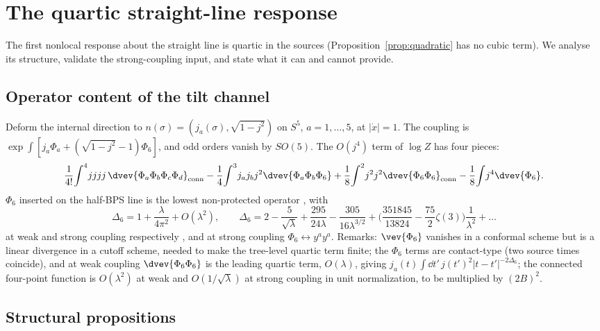 \section{The quartic straight-line response}
\label{sec:quartic}

The first nonlocal response about the straight line is quartic in the sources (Proposition~\ref{prop:quadratic}
has no cubic term). We analyse its structure, validate the strong-coupling input, and state what it can and
cannot provide.

\subsection{Operator content of the tilt channel}

Deform the internal direction to $n(\sigma)=(j_a(\sigma),\sqrt{1-j^2})$ on $S^5$, $a=1,\dots,5$, at $|\dot x|=1$. The
coupling is $\exp\int[j_a\Phi_a+(\sqrt{1-j^2}-1)\Phi_6]$, and odd orders vanish by $SO(5)$. The $O(j^4)$ term of
$\log Z$ has four pieces:
\begin{equation}
\frac1{4!}\!\int^4\!jjjj\,\dvev{\Phi_a\Phi_b\Phi_c\Phi_d}_{\rm conn}
-\frac14\!\int^3\!j_aj_bj^2\dvev{\Phi_a\Phi_b\Phi_6}
+\frac18\!\int^2\!j^2j^2\dvev{\Phi_6\Phi_6}_{\rm conn}
-\frac18\!\int\!j^4\dvev{\Phi_6}.
\end{equation}
$\Phi_6$ inserted on the half-BPS line is the lowest non-protected operator \cite{PolchinskiSully,BGT}, with
\begin{equation}
\Delta_6=1+\frac{\lambda}{4\pi^2}+O(\lambda^2),\qquad
\Delta_6=2-\frac5{\sqrt\lambda}+\frac{295}{24\lambda}-\frac{305}{16\lambda^{3/2}}+\Big(\frac{351845}{13824}-\frac{75}2\zeta(3)\Big)\frac1{\lambda^2}+\dots
\end{equation}
at weak and strong coupling respectively \cite{BGT,GRT,FerreroMeneghelli,GGJ}, and at strong coupling
$\Phi_6\leftrightarrow y^ay^a$. Remarks: $\vev{\Phi_6}$ vanishes in a conformal scheme but is a linear divergence in a
cutoff scheme, needed to make the tree-level quartic term finite; the $\Phi_6$ terms are contact-type (two source
times coincide), and at weak coupling $\dvev{\Phi_6\Phi_6}$ is the leading quartic term, $O(\lambda)$, giving
$j_a(t)\int\dd t'\,j(t')^2|t-t'|^{-2\Delta_6}$; the connected four-point function is $O(\lambda^2)$ at weak and
$O(1/\sqrt\lambda)$ at strong coupling in unit normalization, to be multiplied by $(2B)^2$.

\subsection{Structural propositions}

